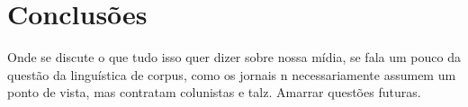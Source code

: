 






\section{Conclusões}

Onde se discute o que tudo isso quer dizer sobre nossa mídia, se fala um pouco da questão da linguística de corpus, como os jornais n necessariamente assumem um ponto de vista, mas contratam colunistas e talz. Amarrar questões futuras.

